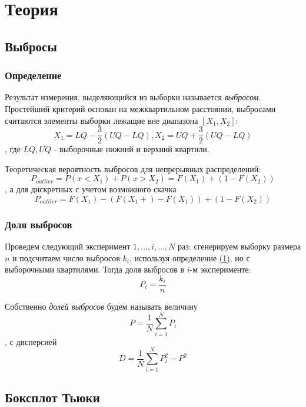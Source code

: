 \documentclass[12pt,a4paper]{article}
\begin{document}
\section{Теория}
\subsection{Выбросы}
\subsubsection{Определение}
Результат измерения, выделяющийся из выборки называется \textit{выбросом}. Простейший критерий основан на межквартильном расстоянии, выбросами считаются элементы выборки лежащие вне диапазона $[X_1, X_2]$:
\begin{equation}\label{1}
X_1=LQ - \frac{3}{2}(UQ-LQ), X_2=UQ + \frac{3}{2}(UQ-LQ)
\end{equation}, где $LQ, UQ$ - выборочные нижний и верхний квартили.

Теоретическая вероятность выбросов для непрерывных распределений:
\begin{equation}\label{2}
P_{outlier} = P(x<X_1) + P(x>X_2) = F(X_1) + (1 - F(X_2))
\end{equation}
, а для дискретных с учетом возможного скачка
\begin{equation}\label{3}
P_{outlier} = F(X_1) - (F(X_1+) - F(X_1)) + (1 - F(X_2))
\end{equation}

\subsubsection{Доля выбросов}
Проведем следующий эксперимент $1,...,i,...,N$ раз: сгенерируем выборку размера $n$ и подсчитаем число выбросов $k_i$, используя определение \hyperref[1]{(1)}, но с выборочными квартилями. Тогда доля выбросов в $i$-м эксперименте:
\begin{equation}
	P_i = \frac{k_i}{n}
\end{equation}

Собственно \textit{долей выбросов} будем называть величину
\begin{equation}\label{5}
	P = \frac{1}{N}\sum_{i=1}^{N} P_i
\end{equation},
с дисперсией
\begin{equation}\label{6}
	D = \frac{1}{N}\sum_{i=1}^{N} P_i^2 - P^2
\end{equation}

\subsection{Боксплот Тьюки}
\end{document}

